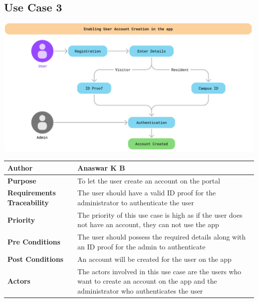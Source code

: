 \documentclass{scrreprt}
\begin{document}
\subsection{Use Case 3}
\begin{center}
\includegraphics*[scale=0.5]{usecase-3.png}
\begin{tabular}{|l|p{10cm}|}
    \hline
    \textbf{Author} & Anaswar K B \\
    \hline
    \textbf{Purpose} &  To let the user create an account on the portal\\
    \hline
    \textbf{Requirements Traceability} & The user should have a valid ID proof for the administrator to authenticate the user\\
    \hline
    \textbf{Priority} & The priority of this use case is high as if the user does not have an account, they can not use the app\\
    \hline
    \textbf{Pre Conditions} &The user should possess the required details along with an ID proof for the admin to authenticate \\
    \hline
    \textbf{Post Conditions} & An account will be created for the user on the app\\
    \hline
    \textbf{Actors} & The actors involved in this use case are the users who want to create an account on the app and the administrator who authenticates the user\\
    \hline
\end{tabular}
\end{center}
\end{document}
